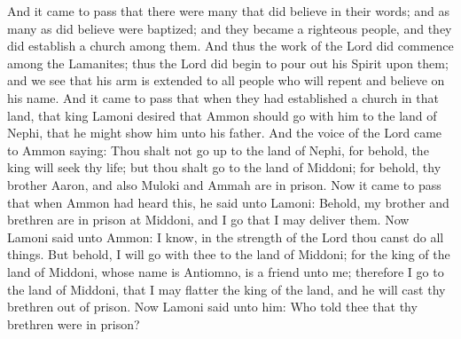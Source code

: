 And it came to pass that there were many that did believe in their words; and as many as did believe were baptized; and they became a righteous people, and they did establish a church among them.
\bverse \iffalse And thus the work of the Lord did commence among the Lamanites; thus the Lord did begin to pour out his Spirit upon them; and we see that his arm is extended to all people who will repent and believe on his name. \fi
And thus the work of the Lord did commence among the Lamanites; thus the Lord did begin to pour out his Spirit upon them; and we see that his arm is extended to all people who will repent and believe on his name.
\bchapter
\bverse \iffalse And it came to pass that when they had established a church in that land, that king Lamoni desired that Ammon should go with him to the land of Nephi, that he might show him unto his father. \fi
And it came to pass that when they had established a church in that land, that king Lamoni desired that Ammon should go with him to the land of Nephi, that he might show him unto his father.
\bverse \iffalse And the voice of the Lord came to Ammon saying: Thou shalt not go up to the land of Nephi, for behold, the king will seek thy life; but thou shalt go to the land of Middoni; for behold, thy brother Aaron, and also Muloki and Ammah are in prison. \fi
And the voice of the Lord came to Ammon saying: Thou shalt not go up to the land of Nephi, for behold, the king will seek thy life; but thou shalt go to the land of Middoni; for behold, thy brother Aaron, and also Muloki and Ammah are in prison.
\bverse \iffalse Now it came to pass that when Ammon had heard this, he said unto Lamoni: Behold, my brother and brethren are in prison at Middoni, and I go that I may deliver them. \fi
Now it came to pass that when Ammon had heard this, he said unto Lamoni: Behold, my brother and brethren are in prison at Middoni, and I go that I may deliver them.
\bverse \iffalse Now Lamoni said unto Ammon: I know, in the strength of the Lord thou canst do all things. But behold, I will go with thee to the land of Middoni; for the king of the land of Middoni, whose name is Antiomno, is a friend unto me; therefore I go to the land of Middoni, that I may flatter the king of the land, and he will cast thy brethren out of prison. Now Lamoni said unto him: Who told thee that thy brethren were in prison? \fi
Now Lamoni said unto Ammon: I know, in the strength of the Lord thou canst do all things. But behold, I will go with thee to the land of Middoni; for the king of the land of Middoni, whose name is Antiomno, is a friend unto me; therefore I go to the land of Middoni, that I may flatter the king of the land, and he will cast thy brethren out of prison. Now Lamoni said unto him: Who told thee that thy brethren were in prison?
